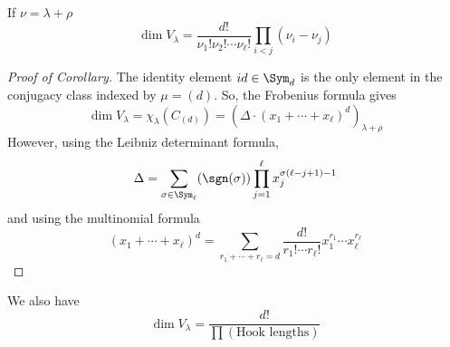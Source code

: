 \documentclass[11pt,leqno,oneside]{amsart}
\numberwithin{thm}{section}
\newcommand{\Vdet}{\Delta}
\newcommand{\rowshift}{\rho}
\begin{document}
\begin{cor}
  If \(\nu = \lambda+\rowshift\)
  \[
    \dim V_\lambda = \frac{d!}{\nu_1!\nu_2!\cdots\nu_\ell!} \prod_{i <
    j} (\nu_i - \nu_j)
  \]
\end{cor}
\begin{proof}[Proof of Corollary]
 The identity element \(id \in \Sym_d\) is the only element in the
 conjugacy class indexed by \(\mu = (d)\). So, the Frobenius formula
 gives \[
   \dim V_\lambda = \chi_{\lambda}(C_{(d)}) = (\Vdet \cdot
   (x_1+\cdots+x_\ell)^d)_{\lambda+\rowshift}
 \]
 However, using the Leibniz determinant formula, \[
   \Vdet = \sum_{\sigma \in \Sym_\ell} (\sgn(\sigma)) \prod_{j=1}^\ell
   x_j^{\sigma(\ell-j+1)-1} 
 \]
 and using the multinomial formula \[
   (x_1+\cdots+x_\ell)^d = \sum_{r_1+\cdots+r_\ell=d}
   \frac{d!}{r_1!\cdots r_\ell!} x_1^{r_1} \cdots x_{\ell}^{r_\ell}
 \]
\end{proof}
\begin{prop}
  We also have \[
    \dim V_\lambda = \frac{d!}{\prod (\text{Hook lengths})}
  \]
\end{prop}
\end{document}
